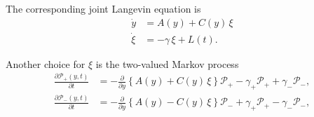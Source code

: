 \documentclass{book}
\numberwithin{equation}{section}
\theoremstyle{plain}
\theoremstyle{definition}
\theoremstyle{remark}
\begin{document}
The corresponding joint Langevin equation is
\begin{equation}
\begin{aligned}
  \dot y &= A(y) + C(y) \, \xi \\
  \dot \xi &= -\gamma \, \xi + L(t).
\end{aligned}
\label{eq:Langevin_joint_y_xi}
\end{equation}

Another choice for $\xi$ is the two-valued Markov process
\begin{equation}
\begin{aligned}
  \frac{ \partial \mathscr P_+(y, t) } { \partial t }
  &=
  - \frac{ \partial } { \partial y }
  \left\{
    A(y) + C(y) \, \xi
  \right\} \mathscr P_+
  -\gamma_+ \mathscr P_+ + \gamma_- \mathscr P_-,
  \\
  \frac{ \partial \mathscr P_-(y, t) } { \partial t }
  &=
  - \frac{ \partial } { \partial y }
  \left\{
    A(y) - C(y) \, \xi
  \right\} \mathscr P_-
  + \gamma_+ \mathscr P_+ - \gamma_- \mathscr P_-,
\end{aligned}
\label{eq:Langevin_joint_y_xi}
\end{equation}
\end{document}
